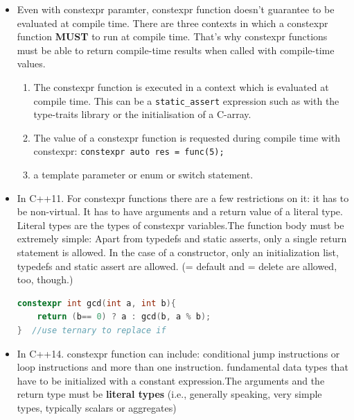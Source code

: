 \documentclass[a4paper,11pt,twoside]{book}
\begin{document}
\begin{itemize}
	\item Even with constexpr paramter, constexpr function doesn't guarantee to be evaluated at compile time. There are three contexts in which a constexpr function \textbf{MUST} to run at compile time. That's why constexpr functions must be able to return compile-time results when called with compile-time values.

	\begin{enumerate}
		\item The constexpr function is executed in a context which is evaluated at compile time. This can be a \texttt{static\_assert} expression such as with the type-traits library or the initialisation of a C-array.
		
		\item The value of a constexpr function is requested during compile time with constexpr: \texttt{constexpr auto res = func(5);}
		
		\item a template parameter or enum or switch statement.
	\end{enumerate}
	
	\item In C++11. For constexpr functions there are a few restrictions on it: it has to be non-virtual. It has to have arguments and a return value of a literal type. Literal types are the types of constexpr variables.The function body must be extremely simple: Apart from typedefs and static asserts, only a single return statement is allowed. In the case of a constructor, only an initialization list, typedefs and static assert are allowed. (= default and = delete are allowed, too, though.)
	
\begin{lstlisting}[frame=single, language=c++]
constexpr int gcd(int a, int b){
	return (b== 0) ? a : gcd(b, a % b);
}  //use ternary to replace if
\end{lstlisting}
	
	\item In C++14. constexpr function can include: conditional jump instructions or loop instructions and more than one instruction. fundamental data types that have to be initialized with a constant expression.The arguments and the return type must be \textbf{literal types} (i.e., generally speaking, very simple types, typically scalars or aggregates)
		

\end{itemize}
\end{document}

